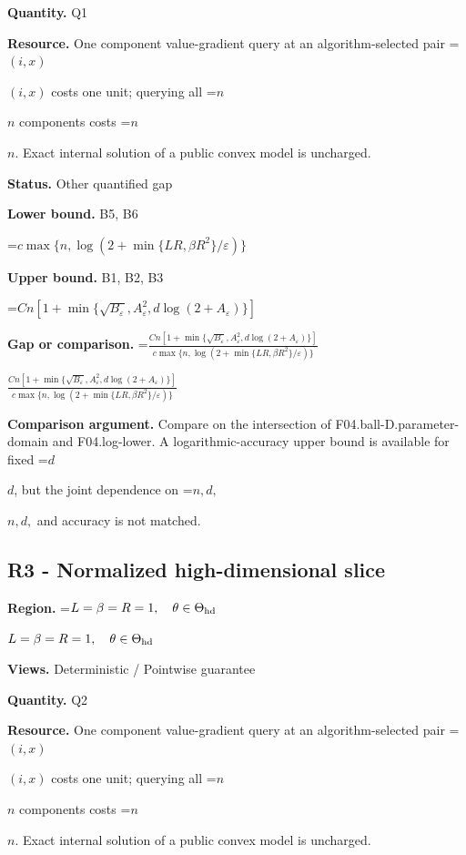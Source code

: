 \documentclass[10pt,a4paper]{article}
\newcommand{\AtlasMath}[1]{\par\begingroup\centering\setbox0=\hbox{$\displaystyle #1$}\ifdim\wd0>1.4\linewidth\typeout{ATLAS WIDE FORMULA: \the\wd0}\fi\ifdim\wd0>\linewidth\resizebox{\linewidth}{!}{\box0}\else\box0\fi\par\endgroup}
\newcommand{\AtlasInlineMath}[1]{\begingroup\setbox0=\hbox{$#1$}\ifdim\wd0>.4\linewidth\endgroup\AtlasMath{#1}\else\endgroup$#1$\fi}
\begin{document}
\textbf{Quantity.} Q1



\textbf{Resource.} One component value-gradient query at an algorithm-selected pair \AtlasInlineMath{(i,x)} costs one unit; querying all \AtlasInlineMath{n} components costs \AtlasInlineMath{n}. Exact internal solution of a public convex model is uncharged.



\textbf{Status.} Other quantified gap



\textbf{Lower bound.} B5, B6



\AtlasMath{c\max\{n,\log(2+\min\{LR,\beta R^2\}/\varepsilon)\}}


\textbf{Upper bound.} B1, B2, B3



\AtlasMath{Cn[1+\min\{\sqrt{B_\varepsilon},A_\varepsilon^2,d\log(2+A_\varepsilon)\}]}


\textbf{Gap or comparison.} \AtlasInlineMath{\frac{Cn[1+\min\{\sqrt{B_\varepsilon},A_\varepsilon^2,d\log(2+A_\varepsilon)\}]}{c\max\{n,\log(2+\min\{LR,\beta R^2\}/\varepsilon)\}}}



\textbf{Comparison argument.} Compare on the intersection of F04.ball-D.parameter-domain and F04.log-lower. A logarithmic-accuracy upper bound is available for fixed \AtlasInlineMath{d}, but the joint dependence on \AtlasInlineMath{n,d,} and accuracy is not matched.



\subsection{R3 - Normalized high-dimensional slice}


\textbf{Region.} \AtlasInlineMath{L=\beta=R=1,\quad\theta\in\Theta_{\rm hd}}



\textbf{Views.} Deterministic / Pointwise guarantee



\textbf{Quantity.} Q2



\textbf{Resource.} One component value-gradient query at an algorithm-selected pair \AtlasInlineMath{(i,x)} costs one unit; querying all \AtlasInlineMath{n} components costs \AtlasInlineMath{n}. Exact internal solution of a public convex model is uncharged.
\end{document}
